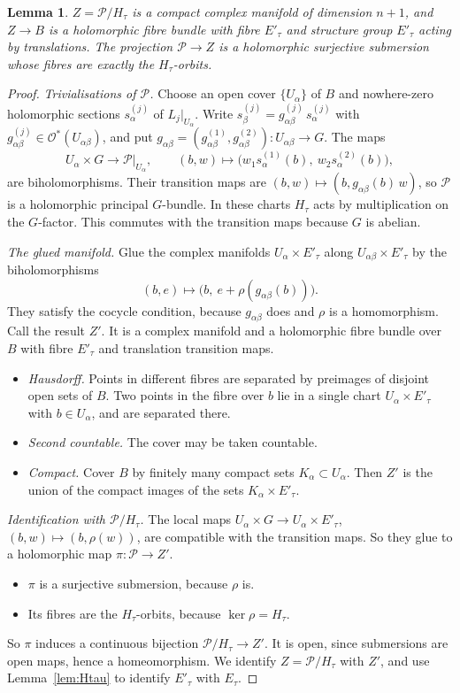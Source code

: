 \documentclass{article}
\newtheorem{lemma}[theorem]{Lemma}
\theoremstyle{definition}
\theoremstyle{plain}
\newcommand{\cO}{\mathcal{O}}
\begin{document}
\begin{lemma}\label{lem:Z}
$Z=\mathcal P/H_\tau$ is a compact complex manifold of dimension $n+1$, and $Z\to B$ is a
holomorphic fibre bundle with fibre $E'_\tau$ and structure group $E'_\tau$ acting by
translations. The projection $\mathcal P\to Z$ is a holomorphic surjective submersion
whose fibres are exactly the $H_\tau$-orbits.
\end{lemma}
\begin{proof}
\emph{Trivialisations of $\mathcal P$.} Choose an open cover $\{U_\alpha\}$ of $B$ and
nowhere-zero holomorphic sections $s^{(j)}_\alpha$ of $L_j|_{U_\alpha}$. Write
$s^{(j)}_\beta=g^{(j)}_{\alpha\beta}\,s^{(j)}_\alpha$ with $g^{(j)}_{\alpha\beta}\in\cO^*(U_{\alpha\beta})$, and put
$g_{\alpha\beta}=(g^{(1)}_{\alpha\beta},g^{(2)}_{\alpha\beta})\colon U_{\alpha\beta}\to G$. The maps
\[
U_\alpha\times G\to\mathcal P|_{U_\alpha},\qquad (b,w)\mapsto\big(w_1s^{(1)}_\alpha(b),\ w_2s^{(2)}_\alpha(b)\big),
\]
are biholomorphisms. Their transition maps are $(b,w)\mapsto(b,g_{\alpha\beta}(b)\,w)$, so
$\mathcal P$ is a holomorphic principal $G$-bundle. In these charts $H_\tau$ acts by
multiplication on the $G$-factor. This commutes with the transition maps because $G$ is
abelian.

\emph{The glued manifold.} Glue the complex manifolds $U_\alpha\times E'_\tau$ along
$U_{\alpha\beta}\times E'_\tau$ by the biholomorphisms
\[(b,e)\mapsto\big(b,\ e+\rho(g_{\alpha\beta}(b))\big).\]
They satisfy the cocycle condition, because $g_{\alpha\beta}$ does and $\rho$ is a homomorphism.
Call the result $Z'$. It is a complex manifold and a holomorphic fibre bundle over $B$ with
fibre $E'_\tau$ and translation transition maps.
\begin{itemize}
\item \emph{Hausdorff.} Points in different fibres are separated by preimages of
  disjoint open sets of $B$. Two points in the fibre over $b$ lie in a single chart
  $U_\alpha\times E'_\tau$ with $b\in U_\alpha$, and are separated there.
\item \emph{Second countable.} The cover may be taken countable.
\item \emph{Compact.} Cover $B$ by finitely many compact sets $K_\alpha\subset U_\alpha$. Then
  $Z'$ is the union of the compact images of the sets $K_\alpha\times E'_\tau$.
\end{itemize}

\emph{Identification with $\mathcal P/H_\tau$.} The local maps
$U_\alpha\times G\to U_\alpha\times E'_\tau$, $(b,w)\mapsto(b,\rho(w))$, are compatible with
the transition maps. So they glue to a holomorphic map $\pi\colon\mathcal P\to Z'$.
\begin{itemize}
\item $\pi$ is a surjective submersion, because $\rho$ is.
\item Its fibres are the $H_\tau$-orbits, because $\ker\rho=H_\tau$.
\end{itemize}
So $\pi$ induces a continuous bijection $\mathcal P/H_\tau\to Z'$. It is open, since
submersions are open maps, hence a homeomorphism. We identify $Z=\mathcal P/H_\tau$ with
$Z'$, and use Lemma~\ref{lem:Htau} to identify $E'_\tau$ with $E_\tau$.
\end{proof}
\end{document}
